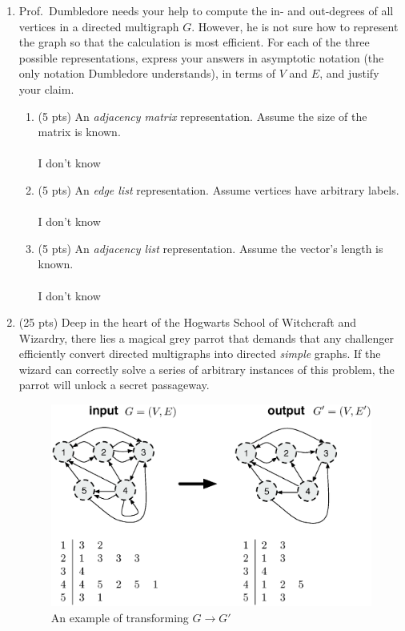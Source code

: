 \documentclass[12pt]{article}
\begin{document}
\begin{enumerate}
\item Prof.\ Dumbledore needs your help to compute the in- and out-degrees of all vertices in a directed multigraph $G$. However, he is not sure how to represent the graph so that the calculation is most efficient. For each of the three possible representations, express your answers in asymptotic notation (the only notation Dumbledore understands), in terms of $V$ and $E$, and justify your claim.
\begin{enumerate}
\item \label{3a} (5 pts) An {\em adjacency matrix} representation. Assume the size of the matrix is known.
\\ \\ I don't know
\pagebreak
\item \label{3b} (5 pts) An {\em edge list} representation. Assume vertices have arbitrary labels.
\\ \\ I don't know
\pagebreak
\item \label{3c} (5 pts) An {\em adjacency list} representation. Assume the vector's length is known.
\\ \\ I don't know
\pagebreak
\end{enumerate}


\item \label{4} (25 pts) Deep in the heart of the Hogwarts School of Witchcraft and
Wizardry, there lies a magical grey parrot that demands that any challenger
efficiently convert directed multigraphs into directed \emph{simple}
graphs. If the wizard can correctly solve a series of arbitrary
instances of this problem, the parrot will unlock a secret passageway. 

\begin{figure}[h!]
\begin{center}
\includegraphics[scale=0.5]{adjacency_list.eps} \\
An example of transforming $G\to G'$
\end{center}
\label{fig:adjlist}
\end{figure}
	

\end{enumerate}
\end{document}
